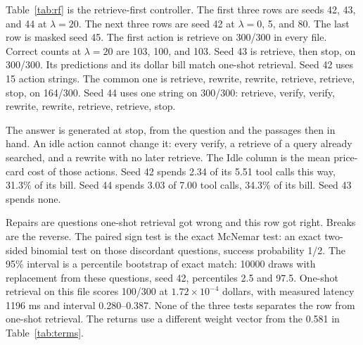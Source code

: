 \documentclass[letterpaper]{article} %
\begin{document}
Table~\ref{tab:rf} is the retrieve-first controller. The first three rows are seeds 42, 43, and 44 at \(\lambda{=}20\). The next three rows are seed 42 at \(\lambda{=}0\), 5, and 80. The last row is masked seed 45. The first action is retrieve on 300/300 in every file. Correct counts at \(\lambda{=}20\) are 103, 100, and 103. Seed 43 is retrieve, then stop, on 300/300. Its predictions and its dollar bill match one-shot retrieval. Seed 42 uses 15 action strings. The common one is retrieve, rewrite, rewrite, retrieve, retrieve, stop, on 164/300. Seed 44 uses one string on 300/300: retrieve, verify, verify, rewrite, rewrite, retrieve, retrieve, stop.

The answer is generated at stop, from the question and the passages then in hand. An idle action cannot change it: every verify, a retrieve of a query already searched, and a rewrite with no later retrieve. The Idle column is the mean price-card cost of those actions. Seed 42 spends 2.34 of its 5.51 tool calls this way, 31.3\% of its bill. Seed 44 spends 3.03 of 7.00 tool calls, 34.3\% of its bill. Seed 43 spends none.

Repairs are questions one-shot retrieval got wrong and this row got right. Breaks are the reverse. The paired sign test is the exact McNemar test: an exact two-sided binomial test on those discordant questions, success probability 1/2. The 95\% interval is a percentile bootstrap of exact match: 10000 draws with replacement from these questions, seed 42, percentiles 2.5 and 97.5. One-shot retrieval on this file scores 100/300 at \(1.72\times 10^{-4}\) dollars, with measured latency 1196 ms and interval 0.280--0.387. None of the three tests separates the row from one-shot retrieval. The returns use a different weight vector from the 0.581 in Table~\ref{tab:terms}.
\end{document}
